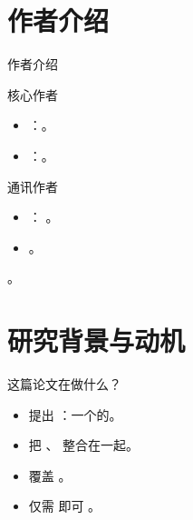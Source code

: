 \renewcommand{\secblurb}{\ph{本节一句话主旨：团队 / 作者与本文的关系}}
\section{作者介绍}

\begin{frame}{作者介绍}
  \begin{block}{核心作者}
    \begin{itemize}
      \item {}：。
      \item {}：。
    \end{itemize}
  \end{block}
  \tightgap
  \begin{block}{通讯作者}
    \begin{itemize}
      \item {}： 。
      \item {}。
    \end{itemize}
  \end{block}
  \tightgap
  \begin{callout}[研究脉络]
    。
  \end{callout}
\end{frame}

\renewcommand{\secblurb}{\ph{本节一句话主旨：本文要解决的问题与核心贡献}}
\section{研究背景与动机}

\begin{frame}{这篇论文在做什么？}
  \begin{itemize}
    \item 提出 ：一个的。
    \item 把 、 整合在一起。
    \item 覆盖 。
    \item 仅需  即可 。
  \end{itemize}
  \deckgap
  \centering
  \hfill
  \hfill
\end{frame}

